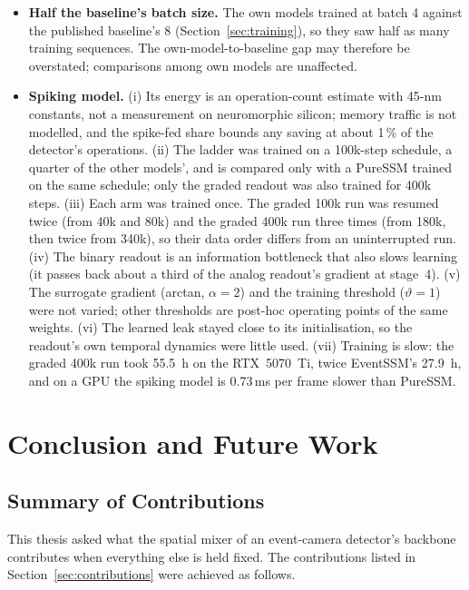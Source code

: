 \documentclass[11pt, a4paper]{report}
\begin{document}
\begin{itemize}
        while PureSSM's BiMamba stack is trained from scratch with stochastic depth. The EventSSM--PureSSM
        comparison therefore isolates the spatial mixer \emph{as instantiated}, including its
        initialisation. Pre-training would be expected to favour the convolutional model, so it is unlikely
        to explain PureSSM's large-object gain, but the two factors are not separated.
  \item \textbf{Half the baseline's batch size.} The own models trained at batch 4 against the published
        baseline's 8 (Section~\ref{sec:training}), so they saw half as many training sequences. The
        own-model-to-baseline gap may therefore be overstated; comparisons among own models are
        unaffected.
  \item \textbf{Spiking model.} (i) Its energy is an operation-count estimate with 45-nm constants, not a
        measurement on neuromorphic silicon; memory traffic is not modelled, and the spike-fed share bounds
        any saving at about 1\,\% of the detector's operations. (ii) The ladder was trained on a 100k-step
        schedule, a quarter of the other models', and is compared only with a PureSSM trained on the same
        schedule; only the graded readout was also trained for 400k steps. (iii) Each arm was trained once.
        The graded 100k run was resumed twice (from 40k and 80k) and the graded 400k run three times (from
        180k, then twice from 340k), so their data order differs from an uninterrupted run. (iv) The binary readout is an
        information bottleneck that also slows learning (it passes back about a third of the analog
        readout's gradient at stage~4). (v) The surrogate gradient (arctan, $\alpha = 2$) and the training
        threshold ($\vartheta = 1$) were not varied; other thresholds are post-hoc operating points of the same
        weights. (vi) The learned leak stayed close to its initialisation, so the readout's own temporal
        dynamics were little used. (vii) Training is slow: the graded 400k run took 55.5~h on the RTX~5070~Ti,
        twice EventSSM's 27.9~h, and on a GPU the spiking model is 0.73\,ms per frame slower than PureSSM.
\end{itemize}


\chapter{Conclusion and Future Work}
\label{ch:conclusion}

\section{Summary of Contributions}
This thesis asked what the spatial mixer of an event-camera detector's backbone contributes when
everything else is held fixed. The contributions listed in Section~\ref{sec:contributions} were achieved
as follows.
\end{document}

